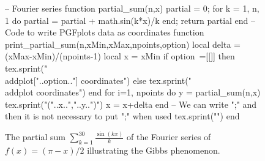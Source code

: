 \begin{figure}
\begin{luacode*}
-- Fourier series
function partial_sum(n,x)
    partial = 0;
    for k = 1, n, 1 do 
        partial = partial + math.sin(k*x)/k 
    end;
    return partial
end
-- Code to write PGFplots data as coordinates
function print_partial_sum(n,xMin,xMax,npoints,option)
    local delta = (xMax-xMin)/(npoints-1)
    local x = xMin
    if option~=[[]] then
        tex.sprint("\\addplot["..option.."] coordinates{")
    else
        tex.sprint("\\addplot coordinates{")
    end
    for i=1, npoints do
        y = partial_sum(n,x)
        tex.sprint("("..x..","..y..")")
        x = x+delta
    end
    -- We can write "};" and then it is not necessary to put ";" when used
    tex.sprint("}") 
end
\end{luacode*}
\newcommand\addLUADEDplot[5][]{\directlua{print_partial_sum(#2,#3,#4,#5,[[#1]])}}
\centering
\pgfplotsset{width=15cm, height=7cm}  
\caption{The partial sum $\sum_{k=1}^{30} \frac{\sin(kx)}{k}$ of the Fourier series  of $f(x)=(\pi-x)/2$ illustrating the Gibbs phenomenon.}\label{fig:Gibbs}
\end{figure}

